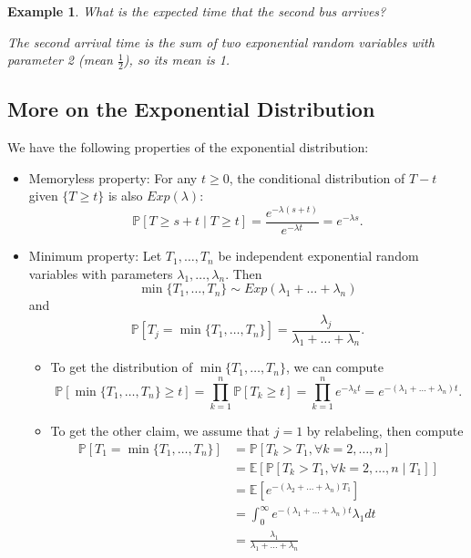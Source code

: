 \documentclass{tufte-handout}
\newcommand*\E{\mathbb{E}}
\renewcommand*\P{\mathbb{P}}
\newtheorem{ex}[thm]{Example}
\theoremstyle{definition}
\begin{document}
\begin{ex}
	What is the expected time that the second bus arrives?

	 The second arrival time is the sum of two exponential random variables with parameter 2 (mean $\frac{1}{2}$), so its mean is 1.
\end{ex}

\subsection{More on the Exponential Distribution}

We have the following properties of the exponential distribution:
\begin{itemize}
	\item Memoryless property: For any $t\ge 0$, the conditional distribution of $T-t$ given $\{T \ge t\}$ is also $Exp(\lambda)$: \[
		\P\left[T \ge s+ t \mid T \ge t\right]  = \frac{e^{-\lambda(s+t)}}{e^{-\lambda t}} = e^{-\lambda s}
	.\] 
	\item Minimum property: Let $T_1,\ldots,T_n$ be independent exponential random variables with parameters $\lambda_1,\ldots,\lambda_n$. Then \[
		\min \{T_1,\ldots,T_n\} \sim Exp(\lambda_1+\ldots+\lambda_n)
	\] and \[
		\P\left[T_j = \min \{T_1,\ldots,T_n\}\right] = \frac{\lambda_j}{\lambda_1+\ldots+\lambda_n}
	.\] 
	\begin{itemize}
		\item To get the distribution of $\min \{T_1,\ldots,T_n\}$, we can compute \[
		\P\left[\min \{T_1,\ldots,T_n\} \ge t\right] = \prod_{k=1}^{n} \P\left[T_k \ge t\right] = \prod_{k=1}^{n} e^{-\lambda_k t} = e^{-(\lambda_1+\ldots+\lambda_n)t}
	.\] 
		\item To get the other claim, we assume that $j=1$ by relabeling, then compute
			\begin{equation}
				\begin{aligned}
					\P\left[T_1 = \min \{T_1,\ldots,T_n\}\right] &= \P\left[T_k > T_1, \forall k=2,\ldots,n\right]  \\
					&= \E\left[\P\left[T_k > T_1, \forall k=2,\ldots,n \mid T_1\right] \right]  \\
					&= \E\left[e^{-\left( \lambda_2+\ldots+\lambda_n \right)T_1}\right] \\
					&= \int_{0}^{\infty} e^{-(\lambda_1+\ldots+\lambda_n)t}\lambda_1 dt  \\
					&= \frac{\lambda_1}{\lambda_1+\ldots+\lambda_n}
				\end{aligned}
			\end{equation}
	\end{itemize}
\end{itemize}
\end{document}
